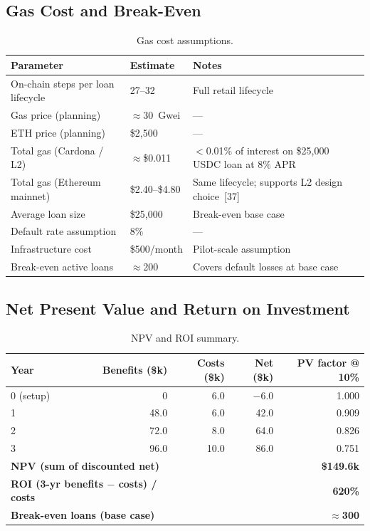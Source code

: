 \documentclass[12pt,a4paper]{report}
\newcommand{\tableheadcolor}{\rowcolor{TableHeadBg}}
\begin{document}
\subsection{Gas Cost and Break-Even}
\label{sec:gas-cost}

\begin{table}[H]
\centering
\caption[Gas cost assumptions]{Gas cost assumptions.}
\label{tab:gas-cost}
\begin{tabular}{p{4.2cm}p{2.8cm}p{6.8cm}}
\toprule
\tableheadcolor
\textbf{Parameter} & \textbf{Estimate} & \textbf{Notes} \\
\midrule
On-chain steps per loan lifecycle & 27--32 & Full retail lifecycle \\
Gas price (planning) & ${\approx}$30~Gwei & --- \\
ETH price (planning) & \$2{,}500 & --- \\
Total gas (Cardona / L2) & ${\approx}$\$0.011 & $<$0.01\% of interest on \$25{,}000 USDC loan at 8\% APR \\
Total gas (Ethereum mainnet) & \$2.40--\$4.80 & Same lifecycle; supports L2 design choice~[37] \\
Average loan size & \$25{,}000 & Break-even base case \\
Default rate assumption & 8\% & --- \\
Infrastructure cost & \$500/month & Pilot-scale assumption \\
Break-even active loans & ${\approx}$200 & Covers default losses at base case \\
\bottomrule
\end{tabular}
\end{table}

\subsection{Net Present Value and Return on Investment}
\label{sec:npv-roi}

\begin{table}[H]
\centering
\caption[NPV and ROI summary]{NPV and ROI summary.}
\label{tab:npv-roi}
\small
\begin{tabular}{@{}lrrrr@{}}
\toprule
\tableheadcolor
\textbf{Year} & \textbf{Benefits (\$k)} & \textbf{Costs (\$k)} & \textbf{Net (\$k)} & \textbf{PV factor @ 10\%} \\
\midrule
0 (setup) & 0 & 6.0 & $-$6.0 & 1.000 \\
1 & 48.0 & 6.0 & 42.0 & 0.909 \\
2 & 72.0 & 8.0 & 64.0 & 0.826 \\
3 & 96.0 & 10.0 & 86.0 & 0.751 \\
\midrule
\multicolumn{2}{l}{\textbf{NPV (sum of discounted net)}} & & \multicolumn{2}{r}{\textbf{\$149.6k}} \\
\multicolumn{2}{l}{\textbf{ROI (3-yr benefits $-$ costs) / costs}} & & \multicolumn{2}{r}{\textbf{620\%}} \\
\multicolumn{2}{l}{\textbf{Break-even loans (base case)}} & & \multicolumn{2}{r}{\textbf{$\approx$300}} \\
\bottomrule
\end{tabular}
\end{table}
\end{document}
